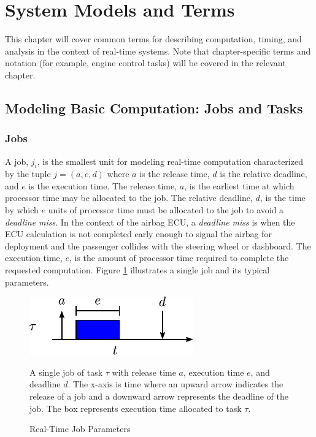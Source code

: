 \section{System Models and Terms}   \label{chap:systemModel}

This chapter will cover common terms for describing computation, timing, and analysis in the context of real-time systems.
Note that chapter-specific terms and notation (for example, engine control tasks) will be covered in the relevant chapter.

\subsection{Modeling Basic Computation: Jobs and Tasks}


\subsubsection{Jobs}

A job, $j_i$, is the smallest unit for modeling real-time computation characterized by the tuple $j = (a,e,d)$ where $a$ is the release time, $d$ is the relative deadline, and $e$ is the execution time.
The release time, $a$, is the earliest time at which processor time may be allocated to the job.
The relative deadline, $d$, is the time by which $e$ units of processor time must be allocated to the job to avoid a \textit{deadline miss}.
In the context of the airbag ECU, a \textit{deadline miss} is when the ECU calculation is not completed early enough to signal the airbag for deployment and the passenger collides with the steering wheel or dashboard. 
The execution time, $e$, is the amount of processor time required to complete the requested computation. 
Figure \ref{fig:rt-job} illustrates a single job and its typical parameters.

\begin{figure}[!htbp]
    \centering
    \includegraphics[width=0.50\linewidth]{fig/singleJob.pdf}
    \caption{Real-Time Job Parameters} A single job of task $\tau$ with release time $a$, execution time $e$, and deadline $d$.
    The x-axis is time where an upward arrow indicates the release of a job and a downward arrow represents the deadline of the job.
    The box represents execution time allocated to task $\tau$.
    \label{fig:rt-job}
\end{figure}

